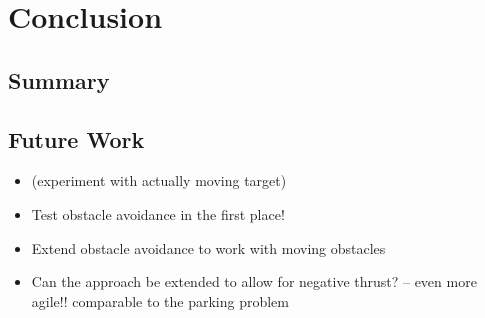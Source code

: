 \chapter{Conclusion}\label{chap:conclusion}
\section{Summary}
\section{Future Work}
\begin{itemize}
    \item (experiment with actually moving target)
    \item Test obstacle avoidance in the first place!
    \item Extend obstacle avoidance to work with moving obstacles
    \item Can the approach be extended to allow for negative thrust? -- even more agile!! comparable to the parking problem
\end{itemize}
